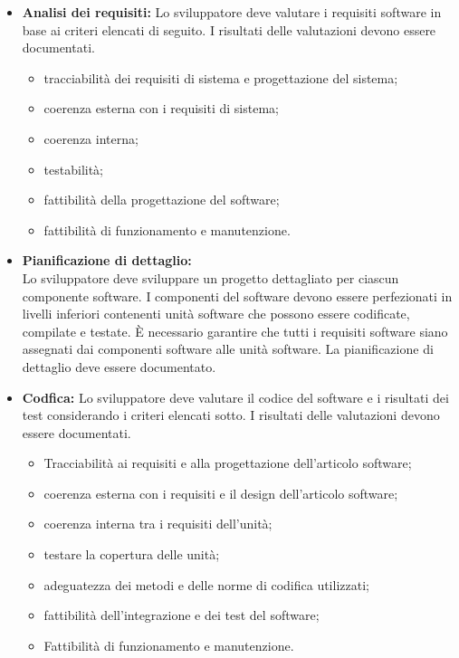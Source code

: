 \begin{itemize}
    \item \textbf{Analisi dei requisiti:}
    Lo sviluppatore deve valutare i requisiti software in base ai criteri elencati di seguito. I risultati delle valutazioni devono essere documentati.
        \begin{itemize}
            \item tracciabilità dei requisiti di sistema e progettazione del sistema;
            \item coerenza esterna con i requisiti di sistema;
            \item coerenza interna;
            \item testabilità;
            \item fattibilità della progettazione del software;
            \item fattibilità di funzionamento e manutenzione.
        \end{itemize}
    \item \textbf{Pianificazione di dettaglio:}\\
    Lo sviluppatore deve sviluppare un progetto dettagliato per ciascun componente software. I componenti del software 
    devono essere perfezionati in livelli inferiori contenenti unità software che possono essere codificate, compilate 
    e testate. È necessario garantire che tutti i requisiti software siano assegnati dai componenti software 
    alle unità software. La pianificazione di dettaglio deve essere documentato.
    
    \item \textbf{Codfica:}
    Lo sviluppatore deve valutare il codice del software e i risultati dei test considerando i criteri elencati sotto. I risultati delle valutazioni devono essere documentati.
    \begin{itemize}
        \item Tracciabilità ai requisiti e alla progettazione dell'articolo software;
        \item coerenza esterna con i requisiti e il design dell'articolo software;
        \item coerenza interna tra i requisiti dell'unità;
        \item testare la copertura delle unità;
        \item adeguatezza dei metodi e delle norme di codifica utilizzati;
        \item fattibilità dell'integrazione e dei test del software;
        \item Fattibilità di funzionamento e manutenzione.   
    \end{itemize}
\end{itemize}
